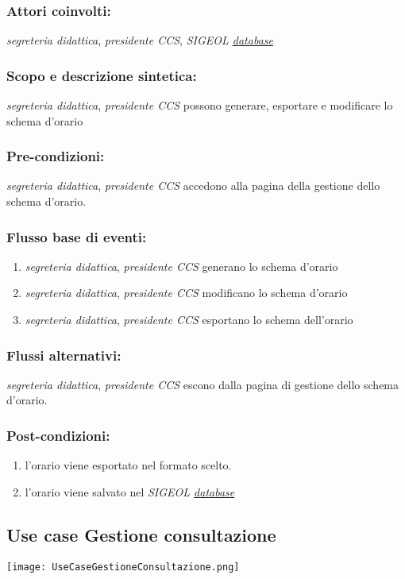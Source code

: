 \documentclass[11pt,a4paper]{article}
\begin{document}
\subsubsection*{Attori coinvolti:}
\textit{segreteria didattica}, \textit{presidente CCS}, \textit{SIGEOL \underline{database}}
\subsubsection*{Scopo e descrizione sintetica:}
\textit{segreteria didattica}, \textit{presidente CCS} possono generare, esportare e modificare lo schema d'orario
\subsubsection*{Pre-condizioni:}
\textit{segreteria didattica}, \textit{presidente CCS} accedono alla pagina della gestione dello schema d'orario.
\subsubsection*{Flusso base di eventi:}
\begin{enumerate} 
 \item \textit{segreteria didattica}, \textit{presidente CCS} generano lo schema d'orario
 \item \textit{segreteria didattica}, \textit{presidente CCS} modificano lo schema d'orario
 \item \textit{segreteria didattica}, \textit{presidente CCS} esportano lo schema dell'orario
\end{enumerate}
\subsubsection*{Flussi alternativi:}
 \textit{segreteria didattica}, \textit{presidente CCS} escono dalla pagina di gestione dello schema d'orario.
\subsubsection*{Post-condizioni:}
\begin{enumerate}
 \item l'orario viene esportato nel formato scelto.
 \item l'orario viene salvato nel \textit{SIGEOL \underline{database}}
\end{enumerate}  

\subsection{Use case Gestione consultazione}
\begin{center} 
 \texttt{[image: UseCaseGestioneConsultazione.png]}
\end{center}
\end{document}
